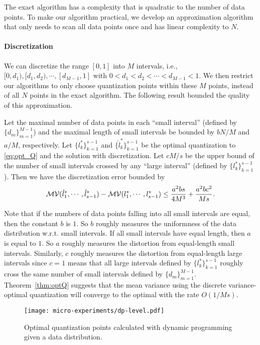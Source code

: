 The exact algorithm has
a complexity that is quadratic to the number
of data points. To make our algorithm practical,
we develop an approximation algorithm that
only needs to scan all data points once and has
linear complexity to $N$.

\vspace{-0.5em}
\paragraph*{Discretization}

We can discretize the range $[0,1]$ into $M$ intervals, i.e., $[0,d_1), [d_1, d_2), \cdots, [d_{M-1}, 1]$ with $0< d_1<d_2<\cdots < d_{M-1}<1$. We then restrict our algorithms
to only choose quantization points within these $M$ points,
instead of all $N$ points in the exact algorithm.
The following result bounded the quality of this
approximation.

\begin{theorem} \label{thm:optQ}
Let the maximal number of data points in each ``small interval'' (defined by $\{d_m\}_{m=1}^{M-1}$) and the maximal length of small intervals be bounded by $bN/M$ and $a/M$, respectively. Let $\{l^*_k\}_{k=1}^{s-1}$ and $\{\hat{l}^*_k\}_{k=1}^{s-1}$ be the optimal quantization to \eqref{eq:opt_Q} and the solution with discretization. Let $cM/s$ be the upper bound of the number of small intervals crossed by any ``large interval'' (defined by $\{l^*_k\}_{k=1}^{s-1}$). Then we have the discretization error bounded by
\[
 \mathcal{MV}(\hat{l}^*_1,\cdots, \hat{l}^*_{s-1}) -  \mathcal{MV}(l^*_1,\cdots, l^*_{s-1}) \leq {a^2b s \over 4 M^3} + {a^2bc^2 \over Ms}.
\]
\end{theorem}

Note that if the numbers of data points falling into all small intervals are equal, then
the constant $b$ is $1$. So $b$ roughly measures the uniformness of the data distribution w.r.t. small intervals. If all small intervals have equal length, then $a$ is equal to $1$. So $a$ roughly measures the distortion from equal-length small intervals. 
Similarly, $c$ roughly measures the distortion from equal-length large intervals since $c=1$ means that all large intervals defined by $\{l^*_k\}_{k=1}^{s-1}$ roughly cross the same number of small intervals defined by $\{d_m\}_{m=1}^{M-1}$. Theorem~\ref{thm:optQ} suggests that the mean variance using the discrete variance-optimal quantization will converge to the optimal with the rate $O(1/Ms)$.


\begin{figure}[t]
\centering    
\texttt{[image: micro-experiments/dp-level.pdf]} 
\vspace{-1em}
\caption{Optimal quantization points calculated with
dynamic programming given a data distribution. }
\label{fig:optimalquantization}
\end{figure} 


